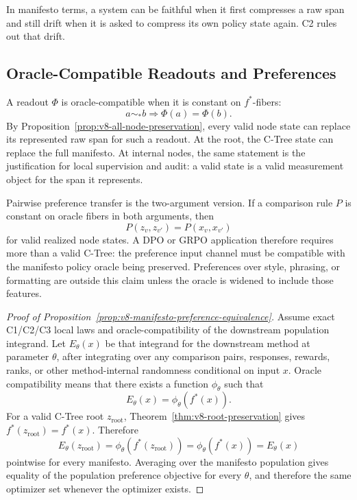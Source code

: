 In manifesto terms, a system can be faithful when it first compresses a raw
span and still drift when it is asked to compress its own policy state again.
C2 rules out that drift.

\subsection{Oracle-Compatible Readouts and Preferences}

A readout \(\Phi\) is oracle-compatible when it is constant on
\(f^\ast\)-fibers:
\[
  a\sim_\ast b \Rightarrow \Phi(a)=\Phi(b).
\]
By Proposition~\ref{prop:v8-all-node-preservation}, every valid node state can
replace its represented raw span for such a readout. At the root, the C-Tree
state can replace the full manifesto. At internal nodes, the same statement is
the justification for local supervision and audit: a valid state is a valid
measurement object for the span it represents.

Pairwise preference transfer is the two-argument version. If a comparison rule
\(P\) is constant on oracle fibers in both arguments, then
\[
  P(z_v,z_{v'})=P(x_v,x_{v'})
\]
for valid realized node states. A DPO or GRPO application therefore requires
more than a valid C-Tree: the preference input channel must be compatible with
the manifesto policy oracle being preserved. Preferences over style, phrasing,
or formatting are outside this claim unless the oracle is widened to include
those features.

\begin{proof}[Proof of Proposition~\ref{prop:v8-manifesto-preference-equivalence}]
Assume exact C1/C2/C3 local laws and oracle-compatibility of the
downstream population integrand. Let \(E_\theta(x)\) be that integrand
for the downstream method at parameter \(\theta\), after integrating
over any comparison pairs, responses, rewards, ranks, or other
method-internal randomness conditional on input \(x\). Oracle
compatibility means that there exists a function \(\phi_\theta\) such that
\[
  E_\theta(x)=\phi_\theta(f^\ast(x)).
\]
For a valid C-Tree root \(z_{\mathrm{root}}\), Theorem~\ref{thm:v8-root-preservation}
gives \(f^\ast(z_{\mathrm{root}})=f^\ast(x)\). Therefore
\[
  E_\theta(z_{\mathrm{root}})
  =
  \phi_\theta(f^\ast(z_{\mathrm{root}}))
  =
  \phi_\theta(f^\ast(x))
  =
  E_\theta(x)
\]
pointwise for every manifesto. Averaging over the manifesto population gives
equality of the population preference objective for every \(\theta\), and
therefore the same optimizer set whenever the optimizer exists.
\end{proof}

